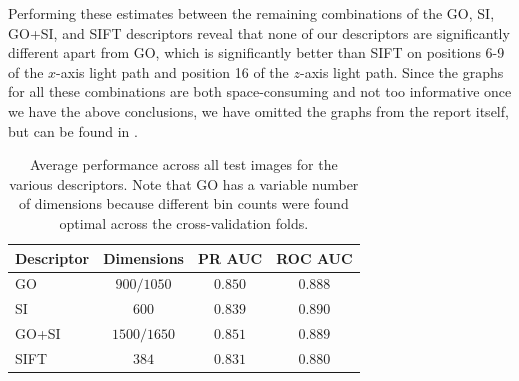 \documentclass[thesis.tex]{subfiles}
\begin{document}
Performing these estimates between the remaining combinations of the GO, SI, GO+SI, and SIFT descriptors reveal that none of our descriptors are significantly different apart from GO, which is significantly better than SIFT on positions 6-9 of the $x$-axis light path and position 16 of the $z$-axis light path. Since the graphs for all these combinations are both space-consuming and not too informative once we have the above conclusions, we have omitted the graphs from the report itself, but can be found in .
%
\begin{table}[tb]
\centering
\begin{tabular}{ l c c c }
\toprule
Descriptor & Dimensions & PR AUC & ROC AUC \\ \midrule
GO & $900/1050$ & $0.850$ & $0.888$ \\ 
SI & $600$ & $0.839$ & $0.890$ \\ 
GO+SI & $1500/1650$ & $0.851$ & $0.889$ \\ 
SIFT & $384$ & $0.831$ & $0.880$ \\ 
\bottomrule
\end{tabular}
\caption{Average performance across all test images for the various descriptors. Note that GO has a variable number of dimensions because different bin counts were found optimal across the cross-validation folds.}
\label{tbl:dtuOverallResults}
\end{table}
%
\end{document}
